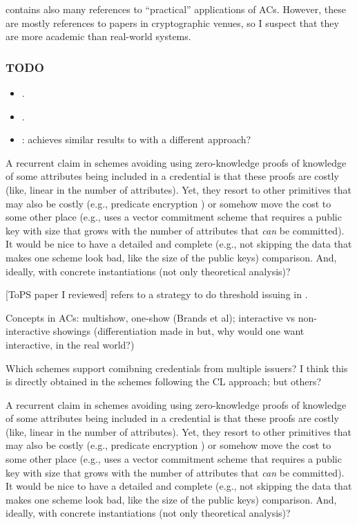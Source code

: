 \cite{hs21} contains also many references to ``practical'' applications of
ACs. However, these are mostly references to papers in cryptographic venues,
so I suspect that they are more academic than real-world systems.

\subsubsection{TODO}

\begin{itemize}
\item \cite{bckl08}.
\item \cite{sand20}.
\item \cite{kkl+16}: achieves similar results to \cite{cgm16} with a different approach?
\end{itemize}

A recurrent claim in schemes avoiding using zero-knowledge proofs of knowledge
of some attributes being included in a credential is that these proofs are costly
(like, linear in the number of attributes). Yet, they resort to other primitives
that may also be costly (e.g., predicate encryption \cite{dmm+18}) or somehow move
the cost to some other place (e.g., \cite{fhs19} uses a vector commitment scheme
that requires a public key with size that grows with the number of attributes
that \emph{can} be committed). It would be nice to have a detailed and complete
(e.g., not skipping the data that makes one scheme look bad, like the size of
the public keys) comparison. And, ideally, with concrete instantiations (not only
theoretical analysis)?

[ToPS paper I reviewed] refers to a strategy to do threshold issuing in \cite{bbh06}.

Concepts in ACs: multishow, one-show (Brands et al); interactive vs non-interactive
showings (differentiation made in \cite[p.6]{fhs19} but, why would one want interactive,
in the real world?)

Which schemes support comibning credentials from multiple issuers? I think this
is directly obtained in the schemes following the CL approach; but others?

A recurrent claim in schemes avoiding using zero-knowledge proofs of knowledge
of some attributes being included in a credential is that these proofs are costly
(like, linear in the number of attributes). Yet, they resort to other primitives
that may also be costly (e.g., predicate encryption \cite{dmm+18}) or somehow move
the cost to some other place (e.g., \cite{fhs19} uses a vector commitment scheme
that requires a public key with size that grows with the number of attributes
that \emph{can} be committed). It would be nice to have a detailed and complete
(e.g., not skipping the data that makes one scheme look bad, like the size of
the public keys) comparison. And, ideally, with concrete instantiations (not only
theoretical analysis)?

